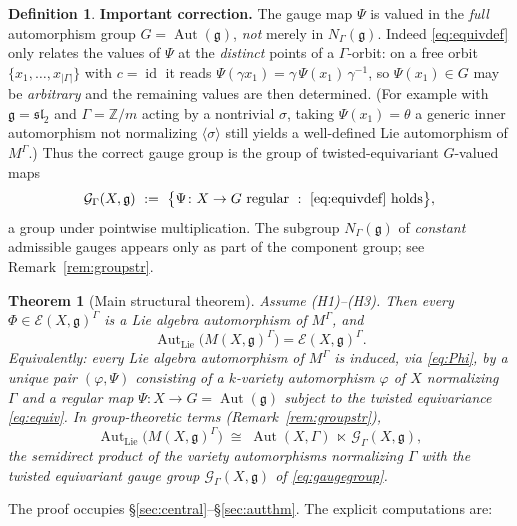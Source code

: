 \documentclass{amsart}
\newtheorem{theorem}{Theorem}
\theoremstyle{definition}
\newtheorem{definition}{Definition}
\DeclareMathOperator{\Aut}{Aut}
\DeclareMathOperator{\id}{id}
\newcommand{\g}{\mathfrak{g}}
\newcommand{\Z}{\mathbb{Z}}
\newcommand{\M}{M}
\begin{document}
\begin{definition}
\medskip
\noindent\textbf{Important correction.}  The gauge map $\Psi$ is valued in
the \emph{full} automorphism group $G=\Aut(\g)$, \emph{not} merely in
$N_\Gamma(\g)$.  Indeed \eqref{eq:equivdef} only relates the values of
$\Psi$ at the \emph{distinct} points of a $\Gamma$-orbit: on a free orbit
$\{x_1,\dots,x_{|\Gamma|}\}$ with $c=\id$ it reads
$\Psi(\gamma x_1)=\gamma\,\Psi(x_1)\,\gamma^{-1}$, so $\Psi(x_1)\in G$ may
be \emph{arbitrary} and the remaining values are then determined.  (For
example with $\g=\mathfrak{sl}_2$ and $\Gamma=\Z/m$ acting by a nontrivial
$\sigma$, taking $\Psi(x_1)=\theta$ a generic inner automorphism not
normalizing $\langle\sigma\rangle$ still yields a well-defined Lie
automorphism of $\M^\Gamma$.)  Thus the correct gauge group is the group of
twisted-equivariant $G$-valued maps
\begin{equation}\label{eq:gaugegroup}
\mathcal G_\Gamma(X,\g)\ :=\ \bigl\{\Psi\colon X\to G\ \text{regular}\ :\
\eqref{eq:equivdef}\ \text{holds}\bigr\},
\end{equation}
a group under pointwise multiplication.  The subgroup $N_\Gamma(\g)$ of
\emph{constant} admissible gauges appears only as part of the component
group; see Remark~\ref{rem:groupstr}.
\end{definition}

\begin{theorem}[Main structural theorem]\label{thm:main}
Assume \textnormal{(H1)--(H3)}.  Then every $\Phi\in\mathcal{E}(X,\g)^\Gamma$
is a Lie algebra automorphism of $\M^\Gamma$, and
\[
\Aut_{\mathrm{Lie}}\bigl(\M(X,\g)^\Gamma\bigr)
=\mathcal{E}(X,\g)^\Gamma .
\]
Equivalently: every Lie algebra automorphism of $\M^\Gamma$ is induced,
via \eqref{eq:Phi}, by a unique pair $(\varphi,\Psi)$ consisting of a
$k$-variety automorphism $\varphi$ of $X$ normalizing $\Gamma$ and a
regular map $\Psi\colon X\to G=\Aut(\g)$ subject to the twisted
equivariance \eqref{eq:equiv}.  In group-theoretic terms (Remark~\ref{rem:groupstr}),
\[
\Aut_{\mathrm{Lie}}\bigl(\M(X,\g)^\Gamma\bigr)\;\cong\;
\Aut(X,\Gamma)\ \ltimes\ \mathcal G_\Gamma(X,\g),
\]
the semidirect product of the variety automorphisms normalizing $\Gamma$
with the twisted equivariant gauge group $\mathcal G_\Gamma(X,\g)$ of
\eqref{eq:gaugegroup}.
\end{theorem}

The proof occupies \S\ref{sec:central}--\S\ref{sec:autthm}.  The
explicit computations are:
\end{document}
